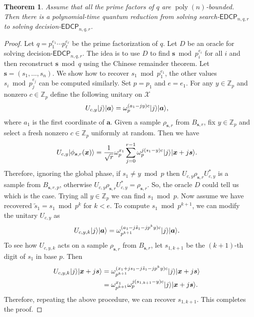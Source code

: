 \documentclass[11pt]{article}
\theoremstyle{plain}
\newtheorem{theorem}{Theorem}
\theoremstyle{definition}
\DeclareMathOperator{\poly}{poly}
\DeclarePairedDelimiter{\ket}{\lvert}{\rangle}
\def\Z{\ensuremath{\mathbb{Z}}}
\def\edcp{\ensuremath{\mathsf{EDCP}}}
\begin{document}
\begin{theorem}
    Assume that all the prime factors of $q$ are $\poly(n)$-bounded. Then there is a polynomial-time quantum reduction from solving search-$\edcp_{n, q, r}$ to solving decision-$\edcp_{n, q, r}$.
\end{theorem}
\begin{proof}
    Let $q = p_1^{e_1} \cdots p_\ell^{e_\ell}$ be the prime factorization of $q$. Let $D$ be an oracle for solving decision-$\edcp_{n, q, r}$. The idea is to use $D$ to find $\bm{s} \bmod p_i^{e_i}$ for all $i$ and then reconstruct $\bm{s} \bmod q$ using the Chinese remainder theorem. Let $\bm{s} = (s_1, \dots, s_n)$. We show how to recover $s_1 \bmod p_1^{e_1}$, the other values $s_i \bmod p_j^{e_j}$ can be computed similarly. Set $p = p_1$ and $e = e_1$.
    For any $y \in \Z_p$ and nonzero $c \in \Z_p$ define the following unitary on $\mathcal{X}$
    \[ U_{c, y} \ket{j}\ket{\bm{a}} = \omega_p^{(a_1 - jy)c}\ket{j}\ket{\bm{a}}, \]
    where $a_1$ is the first coordinate of $\bm{a}$. Given a sample $\rho_{\bm{s}, r}$ from $B_{\bm{s}, r}$, fix $y \in \Z_p$ and select a fresh nonzero $c \in \Z_p$ uniformly at random. Then we have
    \[ U_{c, y}\ket{\phi_{\bm{s}, r}(\bm{x})} = \frac{1}{\sqrt{r}} \omega_p^{x_1}\sum_{j = 0}^{r - 1} \omega_p^{j(s_1 - y)c} \ket{j}\ket{\bm{x} + j\bm{s}}. \]
    Therefore, ignoring the global phase, if $s_1 \ne y \bmod p$ then $U_{c, y} \rho_{\bm{s}, r} U_{c, y}^*$ is a sample from $B_{\bm{s}, r, p}$, otherwise $U_{c, y} \rho_{\bm{s}, r} U_{c, y}^* = \rho_{\bm{s}, r}$. So, the oracle $D$ could tell us which is the case. Trying all $y \in \Z_p$ we can find $s_1 \bmod p$. Now assume we have recovered $\tilde{s}_1 = s_1 \bmod p^k$ for $k < e$. To compute $s_1 \bmod p^{k + 1}$, we can modify the unitary $U_{c, y}$ as 
    \[ U_{c, y, k} \ket{j}\ket{\bm{a}} = \omega_{p^{k + 1}}^{(a_1 - j\tilde{s}_1 - jp^ky)c}\ket{j}\ket{\bm{a}}. \]
    To see how $U_{c, y, k}$ acts on a sample $\rho_{\bm{s}, r}$ from $B_{\bm{s}, r}$, let $s_{1, k + 1}$ be the $(k + 1)$-th digit of $s_1$ in base $p$. Then
    \begin{align*}
        U_{c, y, k} \ket{j}\ket{\bm{x} + j\bm{s}}
        & = \omega_{p^{k + 1}}^{(x_1 + js_1 - j\tilde{s}_1 - jp^ky)c}\ket{j}\ket{\bm{x} + j\bm{s}} \\
        & = \omega_{p^{k + 1}}^{x_1} \omega_p^{j(s_{1, k + 1} - y)c}\ket{j}\ket{\bm{x} + j\bm{s}}.
    \end{align*}
    Therefore, repeating the above procedure, we can recover $s_{1, k + 1}$. This completes the proof.
\end{proof}
\end{document}
